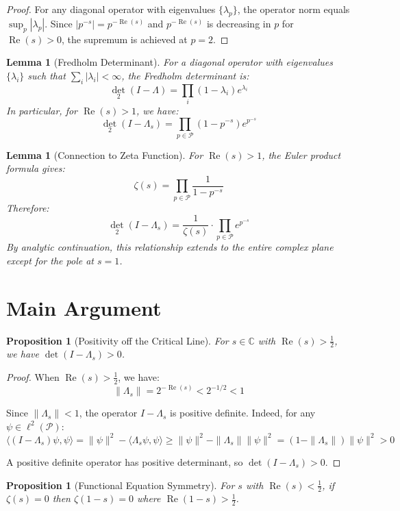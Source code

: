 \documentclass{article}
\newtheorem{lemma}[theorem]{Lemma}
\newtheorem{proposition}[theorem]{Proposition}
\DeclareMathOperator{\Det}{det}
\DeclareMathOperator{\Re}{Re}
\begin{document}
\begin{proof}
For any diagonal operator with eigenvalues $\{\lambda_p\}$, the operator norm equals $\sup_p |\lambda_p|$. Since $|p^{-s}| = p^{-\Re(s)}$ and $p^{-\Re(s)}$ is decreasing in $p$ for $\Re(s) > 0$, the supremum is achieved at $p = 2$.
\end{proof}

\begin{lemma}[Fredholm Determinant]
For a diagonal operator with eigenvalues $\{\lambda_i\}$ such that $\sum_i |\lambda_i| < \infty$, the Fredholm determinant is:
\[
\Det_2(I - \Lambda) = \prod_i (1 - \lambda_i) e^{\lambda_i}
\]
In particular, for $\Re(s) > 1$, we have:
\[
\Det_2(I - \Lambda_s) = \prod_{p \in \mathcal{P}} (1 - p^{-s}) e^{p^{-s}}
\]
\end{lemma}

\begin{lemma}[Connection to Zeta Function]
For $\Re(s) > 1$, the Euler product formula gives:
\[
\zeta(s) = \prod_{p \in \mathcal{P}} \frac{1}{1 - p^{-s}}
\]
Therefore:
\[
\Det_2(I - \Lambda_s) = \frac{1}{\zeta(s)} \cdot \prod_{p \in \mathcal{P}} e^{p^{-s}}
\]
By analytic continuation, this relationship extends to the entire complex plane except for the pole at $s = 1$.
\end{lemma}

\section{Main Argument}

\begin{proposition}[Positivity off the Critical Line]
For $s \in \mathbb{C}$ with $\Re(s) > \frac{1}{2}$, we have $\Det(I - \Lambda_s) > 0$.
\end{proposition}

\begin{proof}
When $\Re(s) > \frac{1}{2}$, we have:
\[
\|\Lambda_s\| = 2^{-\Re(s)} < 2^{-1/2} < 1
\]

Since $\|\Lambda_s\| < 1$, the operator $I - \Lambda_s$ is positive definite. Indeed, for any $\psi \in \ell^2(\mathcal{P})$:
\[
\langle (I - \Lambda_s)\psi, \psi \rangle = \|\psi\|^2 - \langle \Lambda_s\psi, \psi \rangle \geq \|\psi\|^2 - \|\Lambda_s\| \|\psi\|^2 = (1 - \|\Lambda_s\|)\|\psi\|^2 > 0
\]

A positive definite operator has positive determinant, so $\Det(I - \Lambda_s) > 0$.
\end{proof}

\begin{proposition}[Functional Equation Symmetry]
For $s$ with $\Re(s) < \frac{1}{2}$, if $\zeta(s) = 0$ then $\zeta(1-s) = 0$ where $\Re(1-s) > \frac{1}{2}$.
\end{proposition}
\end{document}
